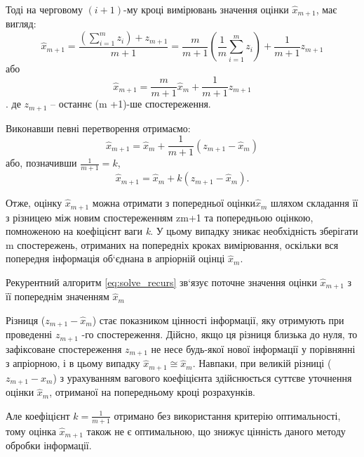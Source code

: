 Тоді на черговому $(i + 1)$-му кроці вимірювань значення оцінки $\hat{x}_{m+1} $, 
має вигляд:
 \begin{equation} 
\hat{x}_{m+1} =\frac{\left(\sum _{i=1}^{m}z_{i}  \right)+z_{m+1}}{m+1} 
=\frac{m}{m+1} \left(\frac{1}{m} \sum _{i=1}^{m}z_{i}  \right)+\frac{1}{m+1} 
z_{m+1}            
\label{eq:__1_21_}
\end{equation}
або 
\[ \hat{x}_{m+1} =\frac{m}{m+1} \hat{x}_{m} +\frac{1}{m+1} z_{m+1}\].
де $z_{m+1}$ -- останнє (m +1)-ше спостереження.

Виконавши певні перетворення отримаємо:
\[\hat{x}_{m+1} =\hat{x}_{m} +\frac{1}{m+1} \left(z_{m+1} 
-\hat{x}_{m} \right)\] 
або, позначивши  $\frac{1}{m+1} =k$,    
\begin{equation} 
\label{eq:solve_recurs} 
\hat{x}_{m+1} =\hat{x}_{m} +k\left(z_{m+1} -\hat{x}_{m} \right). 
\end{equation} 

Отже, оцінку $\hat{x}_{m+1} $ можна отримати з попередньої оцінки$\hat{x}_{m} $ шляхом 
складання її з різницею між новим  спостереженням zm+1 та попередньою оцінкою, помноженою  
на коефіцієнт ваги \textit{k}. У цьому випадку зникає необхідність зберігати m спостережень, 
отриманих на попередніх кроках вимірювання, оскільки вся попередня інформація об`єднана 
в апріорній оцінці $\hat{x}_{m} $. 


% 
Рекурентний алгоритм \eqref{eq:solve_recurs} зв`язує поточне значення оцінки $\hat{x}_{m+1} $ з 
її попереднім значенням $\hat{x}_{m} $

Різниця  ($z_{m+1} -\hat{x}_{m} $) стає показником  цінності 
інформації, яку отримують при проведенні $z_{m+1}$ -го спостереження. Дійсно, 
якщо ця різниця близька до нуля, то зафіксоване спостереження $z_{m+1}$ не несе 
будь-якої нової інформації у порівнянні з апріорною, і в цьому випадку 
$\hat{x}_{m+1} \cong \hat{x}_{m} $. Навпаки, при великій різниці  
($z_{m+1} - \hat{x}_{m} $) з урахуванням вагового коефіцієнта здійснюється суттєве уточнення 
оцінки  $\hat{x}_{m} $,  отриманої на попередньому кроці розрахунків. 

Але коефіцієнт  $k=\frac{1}{m+1} $ отримано без використання критерію  оптимальності, 
тому оцінка $\hat{x}_{m+1} $ також не є оптимальною, що знижує цінність 
даного методу обробки інформації.

